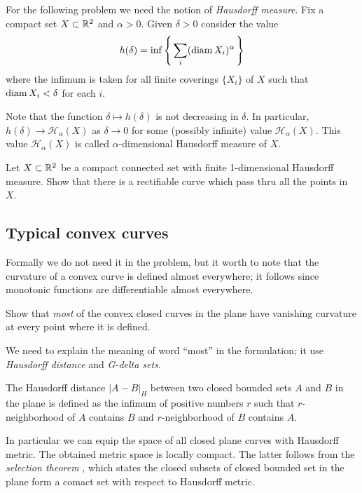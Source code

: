For the following problem we need the notion of 
\emph{Hausdorff measure}.
Fix a compact set $X\subset\mathbb{R}^2$ and $\alpha>0$.
Given $\delta>0$ consider the value
\[h(\delta)=\inf\left\{\,\sum_i(\operatorname{\rm diam}\nolimits X_i)^\alpha\,\right\}\]
where the infimum is taken for all finite coverings $\{X_i\}$ of $X$ 
such that $\operatorname{\rm diam}\nolimits X_i<\delta$ for each $i$.

Note that the function $\delta\mapsto h(\delta)$ is not decreasing in $\delta$.
In particular, $h(\delta)\to \mathcal{H}_\alpha(X)$ as $\delta\to 0$ for some (possibly infinite) value $\mathcal{H}_\alpha(X)$.
This value $\mathcal{H}_\alpha(X)$ is called $\alpha$-dimensional Hausdorff measure of $X$.

\begin{pr}
Let $X\subset \mathbb{R}^2$ be a compact connected set
with finite 1-dimensional Hausdorff measure. 
Show that there is a rectifiable curve which pass thru all the points in $X$.
\end{pr}

\subsection*{Typical convex curves}

Formally we do not need it in the problem, 
but it worth to note that the curvature of a convex curve is defined almost everywhere;
it follows since monotonic functions are differentiable almost everywhere.

\begin{pr}
Show that \emph{most} of the convex closed curves in the plane
have vanishing curvature at every point where it is defined.
\end{pr}

We need to explain the meaning of word ``most'' in the formulation;
it use \emph{Hausdorff distance} and \emph{G-delta sets}.

The Hausdorff distance $|A-B|_H$ between two closed bounded sets $A$ and $B$ in the plane is defined as the infimum of positive numbers $r$ such that $r$-neighborhood of $A$ contains $B$ and $r$-neighborhood of $B$ contains $A$.

In particular we can equip the space of all closed plane curves with Hausdorff metric.
The obtained metric space is locally compact.
The latter follows from the \emph{selection theorem} \cite[see \S18 in][]{blaschke},
which states the closed subsets of closed bounded set in the plane form a comact set with respect to Hausdorff metric. 

